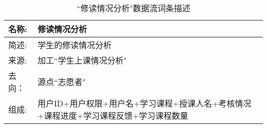 \begin{table}[H]  
\caption{``修读情况分析"数据流词条描述}  
\begin{center}  
    \begin{tabular}{l p{11cm}} 
        \hline
        \quad 名称: & 修读情况分析 \\
        \hline
        \quad 简述: & 学生的修读情况分析 \\
        \hline
        \quad 来源: & 加工``学生上课情况分析" \\
        \hline
        \quad 去向： & 源点``志愿者" \\
        \hline
        \quad 组成: & 用户ID+用户权限+用户名+学习课程+授课人名+考核情况+课程进度+学习课程反馈+学习课程数量 \\
        \hline
    \end{tabular}
    \label{tab1}
\end{center}
\end{table}

